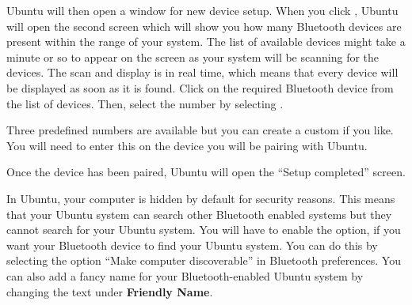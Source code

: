 Ubuntu will then open a window for new device setup. 
When you click , Ubuntu will open the second screen which will show you how many Bluetooth devices are present 
within the range of your system. The list of available devices might take a minute 
or so to appear on the screen as your system will be scanning for the devices. 
The scan and display is in real time, which means that every device will be displayed as soon as it is found. Click on the required Bluetooth device from the list of devices. 
Then, select the  number by selecting . 

Three predefined  numbers are available but you can create a custom  if you like. 
You will need to enter this  on the device you will be pairing with Ubuntu.

Once the device has been paired, Ubuntu will open the ``Setup completed'' screen.

In Ubuntu, your computer is hidden by default for security reasons. 
This means that your Ubuntu system can search other Bluetooth enabled systems but 
they cannot search for your Ubuntu system. You will have to enable the option, if you 
want your Bluetooth device to find your Ubuntu system. You can do this by selecting 
the option ``Make computer discoverable'' in Bluetooth preferences. You can also 
add a fancy name for your Bluetooth-enabled Ubuntu system by changing the text under \textbf{Friendly Name}.
